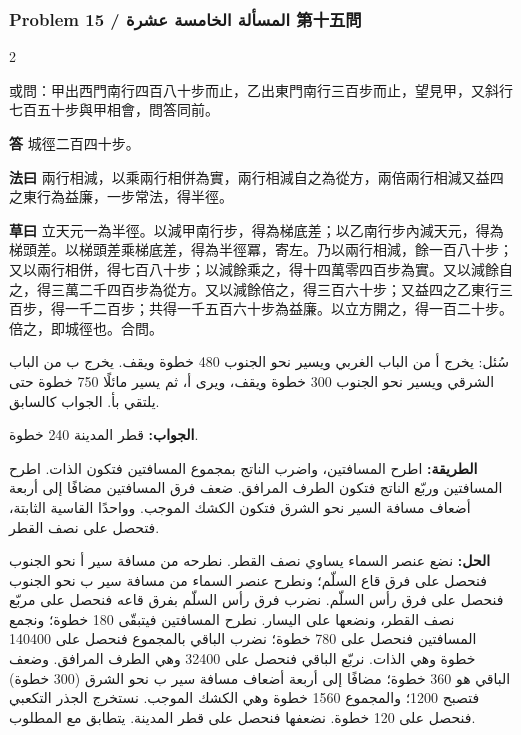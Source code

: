 \documentclass[11pt,a4paper]{article}
\newcommand{\ar}[1]{\arabicfont\beginR #1\endR}
\newcommand{\Answer}[1]{\par\noindent\textbf{\color{problemcolor}答} #1\par}
\newcommand{\Method}[1]{\par\noindent\textbf{\color{problemcolor}法曰} #1\par}
\newcommand{\Workings}[1]{\par\noindent\textbf{\color{problemcolor}草曰} #1\par}
\newcommand{\AnswerAr}{\par\noindent\textbf{\color{problemcolor}\ar{الجواب:}} }
\newcommand{\MethodAr}{\par\noindent\textbf{\color{problemcolor}\ar{الطريقة:}} }
\newcommand{\WorkingsAr}{\par\noindent\textbf{\color{problemcolor}\ar{الحل:}} }
\begin{document}
\vspace{0.5cm}

\subsubsection*{Problem 15 / \ar{المسألة الخامسة عشرة} \quad 第十五問}

\begin{paracol}{2}

\noindent 或問：甲出西門南行四百八十步而止，乙出東門南行三百步而止，望見甲，又斜行七百五十步與甲相會，問答同前。

\vspace{0.2cm}

\Answer{城徑二百四十步。}

\vspace{0.2cm}

\Method{兩行相減，以乘兩行相併為實，兩行相減自之為從方，兩倍兩行相減又益四之東行為益廉，一步常法，得半徑。}

\vspace{0.2cm}

\Workings{立天元一為半徑。以減甲南行步，得為梯底差；以乙南行步內減天元，得為梯頭差。以梯頭差乘梯底差，得為半徑冪，寄左。乃以兩行相減，餘一百八十步；又以兩行相併，得七百八十步；以減餘乘之，得十四萬零四百步為實。又以減餘自之，得三萬二千四百步為從方。又以減餘倍之，得三百六十步；又益四之乙東行三百步，得一千二百步；共得一千五百六十步為益廉。以立方開之，得一百二十步。倍之，即城徑也。合問。}

\switchcolumn

\ar{سُئل: يخرج أ من الباب الغربي ويسير نحو الجنوب 480 خطوة ويقف. يخرج ب من الباب الشرقي ويسير نحو الجنوب 300 خطوة ويقف، ويرى أ، ثم يسير مائلًا 750 خطوة حتى يلتقي بأ. الجواب كالسابق.}

\vspace{0.2cm}

\AnswerAr{قطر المدينة 240 خطوة.}

\vspace{0.2cm}

\MethodAr{اطرح المسافتين، واضرب الناتج بمجموع المسافتين فتكون الذات. اطرح المسافتين وربّع الناتج فتكون الطرف المرافق. ضعف فرق المسافتين مضافًا إلى أربعة أضعاف مسافة السير نحو الشرق فتكون الكشك الموجب. وواحدًا القاسية الثابتة، فتحصل على نصف القطر.}

\vspace{0.2cm}

\WorkingsAr{نضع عنصر السماء يساوي نصف القطر. نطرحه من مسافة سير أ نحو الجنوب فنحصل على فرق قاع السلّم؛ ونطرح عنصر السماء من مسافة سير ب نحو الجنوب فنحصل على فرق رأس السلّم. نضرب فرق رأس السلّم بفرق قاعه فنحصل على مربّع نصف القطر، ونضعها على اليسار. نطرح المسافتين فيتبقّى 180 خطوة؛ ونجمع المسافتين فنحصل على 780 خطوة؛ نضرب الباقي بالمجموع فنحصل على 140400 خطوة وهي الذات. نربّع الباقي فنحصل على 32400 وهي الطرف المرافق. وضعف الباقي هو 360 خطوة؛ مضافًا إلى أربعة أضعاف مسافة سير ب نحو الشرق (300 خطوة) فتصبح 1200؛ والمجموع 1560 خطوة وهي الكشك الموجب. نستخرج الجذر التكعبي فنحصل على 120 خطوة. نضعفها فنحصل على قطر المدينة. يتطابق مع المطلوب.}

\end{paracol}
\end{document}
